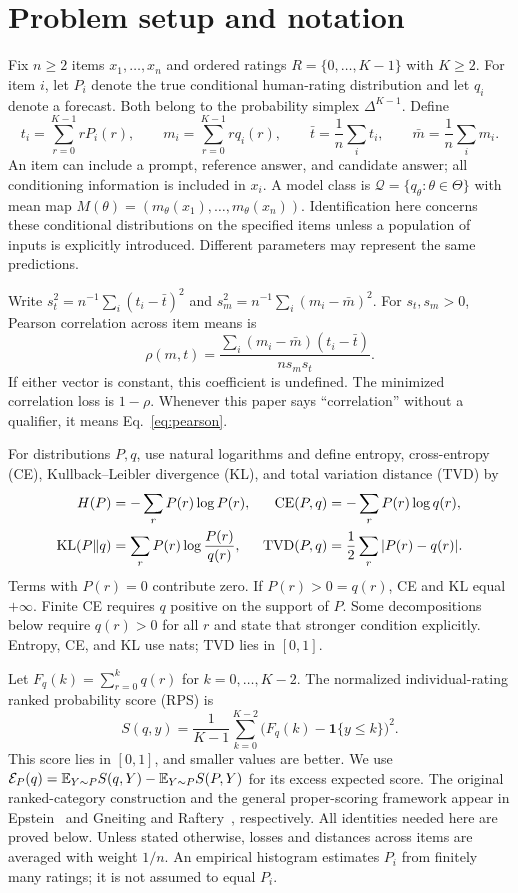 \section{Problem setup and notation}
Fix $n\ge2$ items $x_1,\ldots,x_n$ and ordered ratings $R=\{0,\ldots,K-1\}$ with $K\ge2$.
For item $i$, let $P_i$ denote the true conditional human-rating distribution and let $q_i$ denote a forecast.
Both belong to the probability simplex $\Delta^{K-1}$.
Define
\[
 t_i=\sum_{r=0}^{K-1}rP_i(r),\qquad
 m_i=\sum_{r=0}^{K-1}rq_i(r),\qquad
 \bar t=\frac1n\sum_i t_i,\qquad \bar m=\frac1n\sum_i m_i.
\]
An item can include a prompt, reference answer, and candidate answer; all conditioning information is included in $x_i$.
A model class is $\mathcal Q=\{q_\theta:\theta\in\Theta\}$ with mean map $M(\theta)=(m_\theta(x_1),\ldots,m_\theta(x_n))$.
Identification here concerns these conditional distributions on the specified items unless a population of inputs is explicitly introduced.
Different parameters may represent the same predictions.

Write $s_t^2=n^{-1}\sum_i(t_i-\bar t)^2$ and $s_m^2=n^{-1}\sum_i(m_i-\bar m)^2$.
For $s_t,s_m>0$, Pearson correlation across item means is
\begin{equation}\label{eq:pearson}
 \rho(m,t)=\frac{\sum_i(m_i-\bar m)(t_i-\bar t)}{n s_m s_t}.
\end{equation}
If either vector is constant, this coefficient is undefined.
The minimized correlation loss is $1-\rho$.
Whenever this paper says ``correlation'' without a qualifier, it means Eq.~\eqref{eq:pearson}.

For distributions $P,q$, use natural logarithms and define entropy, cross-entropy (CE), Kullback--Leibler divergence (KL), and total variation distance (TVD) by
\begin{align}
 H(P)&=-\sum_r P(r)\log P(r), &
 \operatorname{CE}(P,q)&=-\sum_r P(r)\log q(r),\\
 \operatorname{KL}(P\Vert q)&=\sum_r P(r)\log\frac{P(r)}{q(r)}, &
 \operatorname{TVD}(P,q)&=\frac12\sum_r|P(r)-q(r)|.
\end{align}
Terms with $P(r)=0$ contribute zero.
If $P(r)>0=q(r)$, CE and KL equal $+\infty$.
Finite CE requires $q$ positive on the support of $P$.
Some decompositions below require $q(r)>0$ for all $r$ and state that stronger condition explicitly.
Entropy, CE, and KL use nats; TVD lies in $[0,1]$.

Let $F_q(k)=\sum_{r=0}^k q(r)$ for $k=0,\ldots,K-2$.
The normalized individual-rating ranked probability score (RPS) is
\begin{equation}\label{eq:rps}
 S(q,y)=\frac1{K-1}\sum_{k=0}^{K-2}\big(F_q(k)-\mathbf1\{y\le k\}\big)^2.
\end{equation}
This score lies in $[0,1]$, and smaller values are better.
We use $\mathcal E_P(q)=\mathbb{E}_{Y\sim P}S(q,Y)-\mathbb{E}_{Y\sim P}S(P,Y)$ for its excess expected score.
The original ranked-category construction and the general proper-scoring framework appear in Epstein~\cite{epstein1969} and Gneiting and Raftery~\cite{gneiting2007}, respectively.
All identities needed here are proved below.
Unless stated otherwise, losses and distances across items are averaged with weight $1/n$.
An empirical histogram estimates $P_i$ from finitely many ratings; it is not assumed to equal $P_i$.
